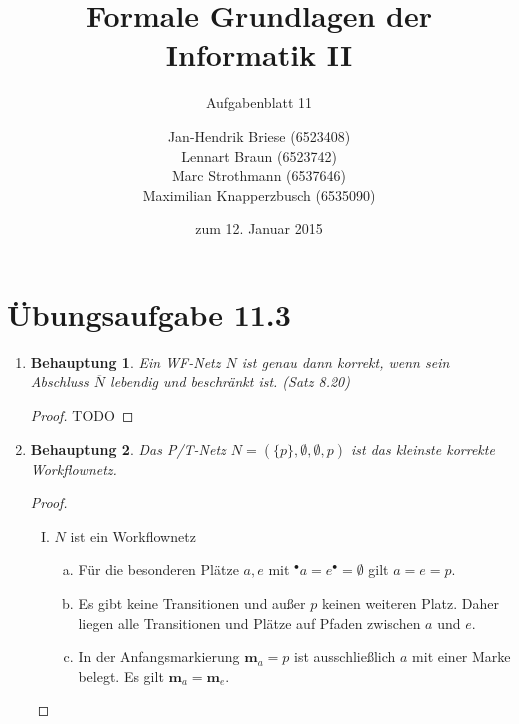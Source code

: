 \documentclass[a4paper]{scrartcl}
\title{Formale Grundlagen der Informatik II}
\subtitle{Aufgabenblatt 11}
\author{
    Jan-Hendrik Briese (6523408) \\
    Lennart Braun (6523742) \\
    Marc Strothmann (6537646) \\
    Maximilian Knapperzbusch (6535090)
}
\date{zum 12. Januar 2015}
\newtheorem*{behaupt}{Behauptung}
\begin{document}
\maketitle

\section*{Übungsaufgabe 11.3} 
\begin{enumerate}
    \item
        \begin{behaupt}
            Ein WF-Netz $N$ ist genau dann korrekt, wenn sein Abschluss
            $\overline{N}$ lebendig und beschränkt ist. (Satz 8.20)
        \end{behaupt}
        \begin{proof}
            TODO
        \end{proof}

    \item
        \begin{behaupt}
            Das P/T-Netz $N = ( \{ p \}, \emptyset, \emptyset, p)$ ist das
            kleinste korrekte Workflownetz.
        \end{behaupt}
        \begin{proof} \hfill \\
            \begin{enumerate}[I.]
                \item $N$ ist ein Workflownetz
                    \begin{enumerate}[a)]
                        \item
                            Für die besonderen Plätze $a, e$ mit
                            $^\bullet a = e^\bullet = \emptyset$
                            gilt $a = e = p$.

                        \item
                            Es gibt keine Transitionen und außer $p$ keinen
                            weiteren Platz.
                            Daher liegen alle Transitionen und Plätze auf
                            Pfaden zwischen $a$ und $e$.

                        \item
                            In der Anfangsmarkierung $\textbf{m}_a = p$ ist
                            ausschließlich $a$ mit einer Marke belegt.
                            Es gilt $\textbf{m}_a = \textbf{m}_e$.

                    \end{enumerate}


\end{enumerate}
\end{proof}
\end{enumerate}
\end{document}
